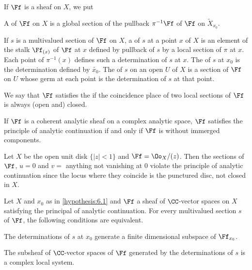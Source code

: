 If $\Ff$ is a sheaf on $X$, we put
\begin{definition}
  A  of $\Ff$ on $X$ is a global section of the
  pullback $\pi^{-1}\Ff$ of $\Ff$ on $\widetilde{X}_{x_0}$.
\end{definition}

If $s$ is a multivalued section of $\Ff$ on $X$, a  of
$s$ at a point $x$ of $X$ is an element of the stalk $\Ff_{(x)}$ of $\Ff$ at
$x$ defined by pullback of $s$ by a local section of $\pi$ at $x$.
Each point of $\pi^{-1}(x)$ defines such a determination of $s$ at $x$.
The  of $s$ at $x_0$ is the determination defined
by $\widetilde{x_0}$.
The  of $s$ on an open $U$ of $X$ is a section of $\Ff$
on $U$ whose germ at each point is the determination of $s$ at that point.

\begin{definition}
  We say that $\Ff$ satisfies the 
  if the coincidence place of two local sections of $\Ff$ is always (open and)
  closed.
\end{definition}
\begin{example}
  If $\Ff$ is a coherent analytic sheaf on a complex analytic space,
  $\Ff$ satisfies the principle of analytic continuation if and only if
  $\Ff$ is without immerged components.

  Let $X$ be the open unit disk $\{|z|<1\}$ and $\Ff=\Oo_X/(z)$.
  Then the sections of $\Ff$, $u=0$ and $v=$ anything not vanishing at $0$
  violate the principle of analytic continuation since the locus where they
  coincide is the punctured disc, not closed in $X$.
\end{example}


\begin{proposition}\label{prop:6.5}
  Let $X$ and $x_0$ as in \ref{hypothesis:6.1} and $\Ff$ a sheaf of $\CC$-vector
  spaces on $X$ satisfying the principal of analytic continuation. For every
  multivalued section $s$ of $\Ff$, the following conditions are equivalent.
  \begin{proplist}
    \item The determinations of $s$ at $x_0$ generate a finite dimensional
    subspace of $\Ff_{x_0}$.
    \item The subsheaf of $\CC$-vector spaces of $\Ff$ generated by the
    determinations of $s$ is a complex local system.
  \end{proplist}
\end{proposition}

